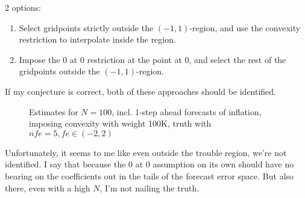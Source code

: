 \documentclass[11pt]{article}
\def \myFigPath {../../figures/}
\renewcommand{\[}{\begin{equation}}
\renewcommand{\]}{\end{equation}}
\def\myTinyFigScale{0.16}
\begin{document}
2 options:
\begin{enumerate}
\item Select gridpoints strictly outside the $(-1,1)$-region, and use the convexity restriction to interpolate inside the region.
\item Impose the 0 at 0 restriction at the point at 0, and select the rest of the gridpoints outside the  $(-1,1)$-region.
\end{enumerate}
If my conjecture is correct, both of these approaches should be identified.
\clearpage
\begin{figure}[h!]
{}
\caption{Estimates for $N=100$, incl. 1-step ahead forecasts of inflation, imposing convexity with weight 100K, truth with $nfe=5, fe \in(-2,2)$}
\end{figure}

Unfortunately, it seems to me like even outside the trouble region, we're not identified. I say that because the 0 at 0 assumption on its own should have no bearing on the coefficients out in the tails of the forecast error space. But also there, even with a high $N$, I'm not nailing the truth.
\end{document}
